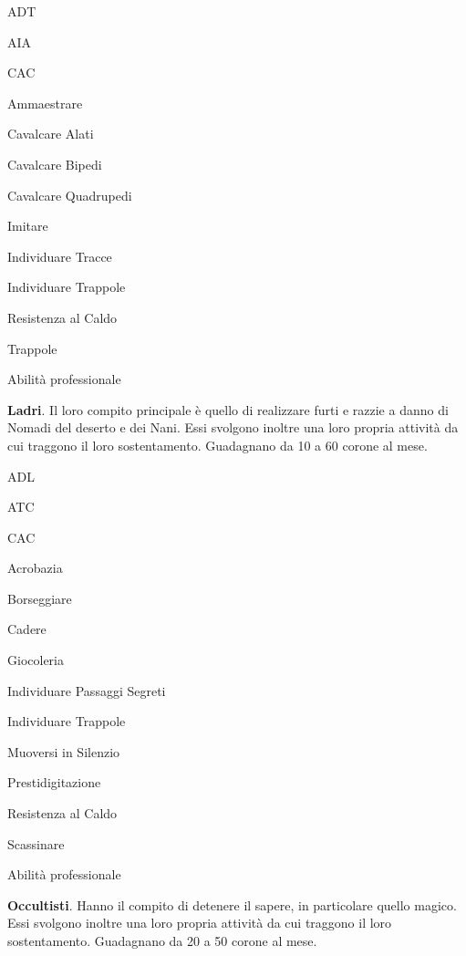 \begin{abilist}
\item ADT
\item AIA
\item CAC
\item Ammaestrare
\item Cavalcare Alati
\item Cavalcare Bipedi
\item Cavalcare Quadrupedi
\item Imitare
\item Individuare Tracce
\item Individuare Trappole
\item Resistenza al Caldo
\item Trappole
\item Abilit\`a professionale
\end{abilist}


\textbf{Ladri}. Il loro compito principale \`e quello di realizzare
furti e razzie a danno di Nomadi del deserto e dei Nani. Essi svolgono
inoltre una loro propria attivit\`a da cui traggono il loro
sostentamento. Guadagnano da 10 a 60 corone al mese.

\begin{abilist}
\item ADL
\item ATC
\item CAC
\item Acrobazia
\item Borseggiare
\item Cadere
\item Giocoleria
\item Individuare Passaggi Segreti
\item Individuare Trappole
\item Muoversi in Silenzio
\item Prestidigitazione
\item Resistenza al Caldo
\item Scassinare
\item Abilit\`a professionale
\end{abilist}


\textbf{Occultisti}. Hanno il compito di detenere il sapere, in
particolare quello magico. Essi svolgono inoltre una loro propria
attivit\`a da cui traggono il loro sostentamento. Guadagnano da 20 a
50 corone al mese.


